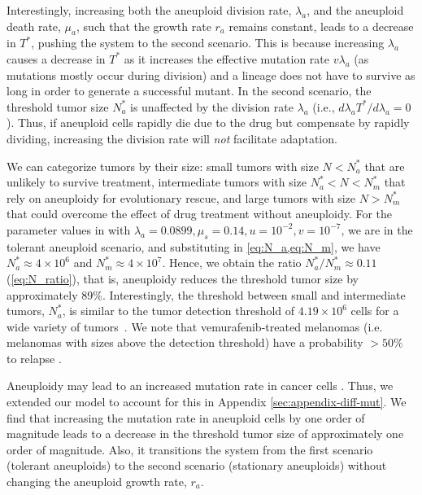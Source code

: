 \documentclass[12pt]{extarticle}
\renewcommand{\Delta}{r}
\begin{document}
Interestingly, increasing both the aneuploid division rate, $\lambda_a$, and the aneuploid death rate, $\mu_a$, such that the growth rate $\Delta_a$ remains constant, leads to a decrease in $T^*$, pushing the system to the second scenario. This is because increasing $\lambda_a$ causes a decrease in $T^*$ as  it increases the effective mutation rate $v\lambda_a$ (as mutations mostly occur during division) and a lineage does not have to survive as long in order to generate a successful mutant. 
In the second scenario, the threshold tumor size $N_a^*$ is unaffected by the division rate $\lambda_a$ (i.e., $d \lambda_a T^*/d\lambda_a = 0$). Thus, if aneuploid cells rapidly die due to the drug but compensate by rapidly dividing, increasing the division rate will \emph{not} facilitate adaptation. %

We can categorize tumors by their size: small tumors with size $N<N_a^*$ that are unlikely to survive treatment, intermediate tumors with size $N_a^* < N < N_m^*$ that rely on aneuploidy for evolutionary rescue, and large tumors with size $N > N_m^*$ that could overcome the effect of drug treatment without aneuploidy.
For the parameter values in  with $\lambda_a=0.0899,\mu_s=0.14, u=10^{-2}, v=10^{-7}$, we are in the tolerant aneuploid scenario, and substituting in \cref{eq:N_a,eq:N_m}, we have $N_a^* \approx 4 \times 10^6$ and $N_m^* \approx 4 \times 10^7$.
Hence, we obtain the ratio $N^*_a/N^*_m \approx 0.11$ (\cref{eq:N_ratio}), that is, aneuploidy reduces the threshold tumor size by approximately 89\%.
Interestingly, the threshold between small and intermediate tumors, $N_a^*$, is similar to the tumor detection threshold of $4.19 \times 10^6$ cells for a wide variety of tumors~\citep{avanzini2019cancer}. We note that vemurafenib-treated melanomas (i.e. melanomas with sizes above the detection threshold) have a probability $>50\%$ to relapse \citep{piejko2023long,handa2022long}. %

Aneuploidy may lead to an increased mutation rate in cancer cells \citep{garribba2023short,passerini2016presence,janssen2011chromosome}. Thus, we extended our model to account for this in Appendix \ref{sec:appendix-diff-mut}. We find that increasing the mutation rate in aneuploid cells by one order of magnitude leads to a decrease in the threshold tumor size of approximately one order of magnitude. Also, it transitions the system from the first scenario (tolerant aneuploids) to the second scenario (stationary aneuploids) without changing the aneuploid growth rate, $\Delta_a$. %
\end{document}
